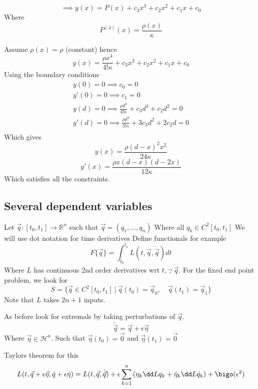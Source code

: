 \documentclass{E:/Documents/Latex/myassignment}
\begin{document}
\[\implies y(x) = P(x) + c_3x^3 + c_2x^2 + c_1x + c_0\]
Where
\[P^{(4)}(x) = \frac{\rho(x)}{\kappa}\]

Assume $\rho(x) = \rho$ (constant) hence
\[y(x) =\frac{\rho x^4}{4! \kappa}  + c_3x^3 + c_2x^2 + c_1x + c_0\]
Using the boundary conditions
\begin{align*}
y(0) = 0 \implies c_0 = 0\\
y'(0) = 0 \implies c_1 = 0\\
y(d) = 0 \implies \frac{\rho d^4}{4! \kappa} + c_3 d^3 + c_2 d^2 =0\\
y'(d) = 0 \implies \frac{\rho d^3}{3! \kappa} + 3c_3 d^2 + 2c_2 d =0\\
\end{align*}
Which gives
\[y(x) = \frac{\rho(d-x)^2 x^2}{24 \kappa}\]
\[y'(x) = \frac{\rho x (d-x ) (d-2x)}{12 \kappa}\]
Which satisfies all the constraints.

\subsection{Several dependent variables}
Let $\vec q : [t_0,t_1] \to \mathbb{R}^n$ such that $\vec q = (q_1,\ldots,q_n)$
Where all $q_k\in C^2 [t_0,t_1]$
We will use dot notation for time derivatives
Define functionals for example
\[F\{\vec q\} = \int_{t_0}^{t_1} L (t,\vec q, \dot{\vec q}) dt\]
Where $L$ has continuous 2nd order derivatives wrt $t,\vec ,\dot{\vec q}$.
For the fixed end point problem, we look for
\[S = \{\vec q \in C^2[t_0,t_1]\ |\ \vec q(t_0) = \vec q_0, \quad \vec q(t_1) = \vec q_1\}\]
Note that $L$ takes $2n+1$ inputs.

As before look for extremals by taking perturbations of $\vec q$.
\[\tilde{\vec q} = \vec q + \epsilon \vec \eta\]
Where $\vec \eta \in \mathcal{H}^n$.
Such that $\vec \eta(t_0) = \vec 0$ and $\vec \eta(t_1) = \vec 0$

Taylors theorem for this
\[L(t,\vec q+ \epsilon \vec \eta, \dot q+ \epsilon \dot \eta) = L(t,\vec q,\dot {\vec q}) + \epsilon \sum_{k=1}^n \left(\eta_k \dd L{q_k} + \dot{\eta}_k \dd L{\dot q_k}\right) + \bigo(\epsilon^2)\]
\end{document}
